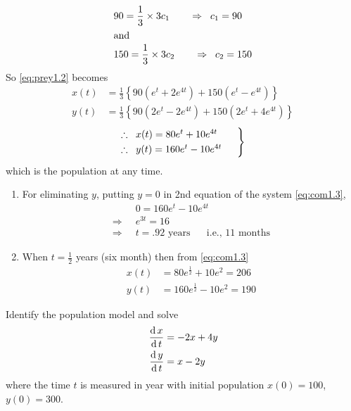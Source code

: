 \documentclass[../main-sheet.tex]{subfiles}
\begin{document}
\begin{soln}
    \begin{align*}
        &90=\frac{1}{3}\times 3c_1\qquad\Rightarrow\;\;c_1=90\\
        \intertext{and}
        &150=\frac{1}{3}\times3c_2\qquad\Rightarrow\;\;c_2=150
    \end{align*}
    So \eqref{eq:prey1.2} becomes
    \begin{align*}
        x(t)&=\frac{1}{3}\left\{ 90(e^t+2e^{4t})+150(e^t-e^{4t}) \right\}\\
        y(t)&=\frac{1}{3}\left\{ 90(2e^t-2e^{4t})+150(2e^t+4e^{4t}) \right\}
    \end{align*}
    \begin{equation}
        \begin{rcases}
            \therefore\;\;x(t)=80e^t+10e^{4t}\qquad \\
            \therefore\;\;y(t)=160e^t-10e^{4t}
        \end{rcases}
        \label{eq:com1.3}
    \end{equation}
    which is the population at any time.
    \begin{enumerate}[label=(\roman*)]
        \item For eliminating \(y\), putting \(y=0\) in 2nd equation of the system \eqref{eq:com1.3},
        \begin{align*}
            &0=160e^t-10e^{4t}\\
            \Rightarrow\;\;&e^{3t}=16\\
            \Rightarrow\;\;&t=.92\text{ years }\quad \text{ i.e., 11 months}
        \end{align*}
        \item When \(t=\frac{1}{2} \) years (six month) then from \eqref{eq:com1.3}
        \begin{align*}
            x(t)&=80e^{\frac{1}{2}}+10e^{2}=206 \\
            y(t)&=160e^{\frac{1}{2}}-10e^{2}=190
        \end{align*}
    \end{enumerate}
\end{soln}
\begin{prob}
    Identify the population model and solve
    \begin{align*}
        \,\frac{\mathrm{d}\,x}{\mathrm{d}\,t}&=-2x+4y\\
        \,\frac{\mathrm{d}\,y}{\mathrm{d}\,t}&=x-2y
    \end{align*}
    where the time \(t\) is measured in year with initial population \(x(0)=100\), \(y(0)=300\).
\end{prob}
\end{document}
